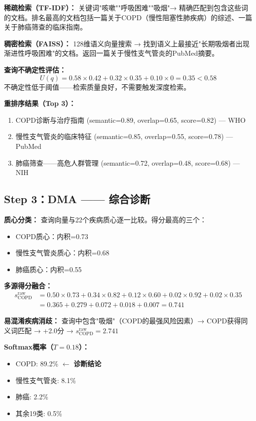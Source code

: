 \documentclass[11pt,a4paper]{ctexart}
\begin{document}
\textbf{稀疏检索（TF-IDF）：} 关键词"咳嗽""呼吸困难""吸烟"→ 精确匹配到包含这些词的文档。排名最高的文档包括一篇关于COPD（慢性阻塞性肺疾病）的综述、一篇关于肺癌筛查的临床指南。

\textbf{稠密检索（FAISS）：} 128维语义向量搜索 → 找到语义上最接近"长期吸烟者出现渐进性呼吸困难"的文档。返回一篇关于慢性支气管炎的PubMed摘要。

\textbf{查询不确定性评估：}
$$U(q) = 0.58 \times 0.42 + 0.32 \times 0.35 + 0.10 \times 0 = 0.35 < 0.58$$
不确定性低于阈值——检索质量良好，不需要触发深度检索。

\textbf{重排序结果（Top 3）：}
\begin{enumerate}[nosep]
\item COPD诊断与治疗指南 (semantic=0.89, overlap=0.65, score=0.82) — WHO
\item 慢性支气管炎的临床特征 (semantic=0.85, overlap=0.55, score=0.78) — PubMed
\item 肺癌筛查——高危人群管理 (semantic=0.72, overlap=0.48, score=0.68) — NIH
\end{enumerate}

\subsection{Step 3：DMA —— 综合诊断}

\textbf{质心分类：} 查询向量与22个疾病质心逐一比较。得分最高的三个：
\begin{itemize}[nosep]
\item COPD质心：内积=0.73
\item 慢性支气管炎质心：内积=0.68
\item 肺癌质心：内积=0.55
\end{itemize}

\textbf{多源得分融合：}
\begin{align*}
s_{\text{COPD}}^{\text{raw}} &= 0.50 \times 0.73 + 0.34 \times 0.82 + 0.12 \times 0.60 + 0.02 \times 0.92 + 0.02 \times 0.35 \\
&= 0.365 + 0.279 + 0.072 + 0.018 + 0.007 = 0.741
\end{align*}

\textbf{易混淆疾病消歧：} 查询中包含"吸烟"（COPD的最强风险因素）→ COPD获得同义词匹配 → +2.0分 → $s_{\text{COPD}}^{\text{raw}} = 2.741$

\textbf{Softmax概率（$T=0.18$）：}
\begin{itemize}[nosep]
\item COPD: 89.2\% $\leftarrow$ \textbf{诊断结论}
\item 慢性支气管炎: 8.1\%
\item 肺癌: 2.2\%
\item 其余19类: 0.5\%
\end{itemize}
\end{document}
